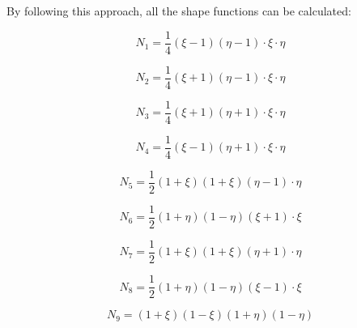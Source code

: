By following this approach, all the shape functions can be calculated:

\begin{equation}
N_1 = \frac{1}{4} \left(\xi - 1\right) \left( \eta -1 \right) \cdot\xi \cdot\eta
\end{equation}

\begin{equation}
N_2 = \frac{1}{4} \left(\xi + 1\right) \left( \eta -1 \right) \cdot\xi \cdot\eta
\end{equation}

\begin{equation}
N_3 = \frac{1}{4} \left(\xi + 1\right) \left( \eta + 1 \right) \cdot\xi \cdot\eta
\end{equation}

\begin{equation}
N_4 = \frac{1}{4} \left(\xi - 1\right) \left( \eta + 1 \right) \cdot\xi \cdot\eta
\end{equation}

\begin{equation}
N_5 = \frac{1}{2} \left(1 + \xi \right) \left( 1 + \xi \right)  \left( \eta - 1\right) \cdot\eta
\end{equation}

\begin{equation}
N_6 = \frac{1}{2} \left(1 + \eta \right) \left( 1 - \eta \right)  \left( \xi + 1\right) \cdot\xi
\end{equation}

\begin{equation}
N_7 = \frac{1}{2} \left(1 + \xi \right) \left( 1 + \xi \right)  \left( \eta + 1\right) \cdot\eta
\end{equation}

\begin{equation}
N_8 = \frac{1}{2} \left(1 + \eta \right) \left( 1 - \eta \right)  \left( \xi - 1\right) \cdot\xi
\end{equation}

\begin{equation}
N_9 = \left(1 + \xi \right) \left( 1 - \xi \right)  \left( 1 + \eta \right) \left(1 - \eta \right)
\end{equation}

